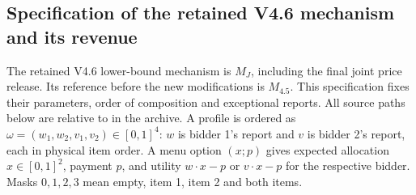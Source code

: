 \subsection{Specification of the retained V4.6 mechanism and its revenue}
\label{sec:active-reference-specification}

The retained V4.6 lower-bound mechanism is $M_J$, including the final joint price
release. Its reference before the new modifications is $M_{4.5}$. This
specification fixes their parameters, order of composition and exceptional
reports. All source paths below are relative to
 in the
archive. A profile is ordered as
$\omega=(w_1,w_2,v_1,v_2)\in[0,1]^4$: $w$ is bidder 1's report and $v$ is
bidder 2's report, each in physical item order. A menu option $(x;p)$ gives
expected allocation $x\in[0,1]^2$, payment $p$, and utility $w\cdot x-p$
or $v\cdot x-p$ for the respective bidder.
Masks $0,1,2,3$ mean empty, item 1, item 2 and both items.

